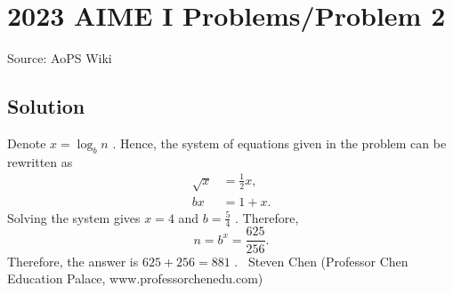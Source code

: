 \documentclass[12pt]{article}
\begin{document}
\section*{{2023 AIME I Problems/Problem 2}}
Source: AoPS Wiki

\subsection*{Solution}
Denote $x = \log_b n$ .
Hence, the system of equations given in the problem can be rewritten as \begin{align*} \sqrt{x} & = \frac{1}{2} x , \\ bx & = 1 + x . \end{align*} Solving the system gives $x = 4$ and $b = \frac{5}{4}$ .
Therefore, \[n = b^x = \frac{625}{256}.\] Therefore, the answer is $625 + 256 = \boxed{881}$ . ~Steven Chen (Professor Chen Education Palace, www.professorchenedu.com)
\end{document}
